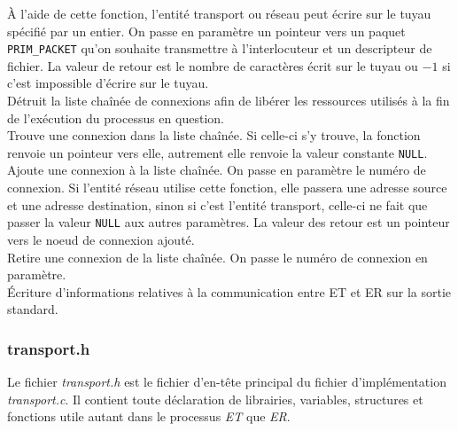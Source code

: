 \documentclass[11pt,french]{article}
\begin{document}
            
            À l'aide de cette fonction, l'entité transport ou réseau peut écrire sur le tuyau spécifié par un entier. On passe en paramètre un pointeur 
            vers un paquet \texttt{PRIM\_PACKET} qu'on souhaite transmettre à l'interlocuteur et un descripteur de fichier. La valeur de retour est
            le nombre de caractères écrit sur le tuyau ou $-1$ si c'est impossible d'écrire sur le tuyau.\\

            
            Détruit la liste chaînée de connexions afin de libérer les ressources utilisés à la fin de l'exécution du processus en question.\\

            
            Trouve une connexion dans la liste chaînée. Si celle-ci s'y trouve, la fonction renvoie un pointeur vers elle, autrement elle renvoie 
            la valeur constante \texttt{NULL}.\\

            
            Ajoute une connexion à la liste chaînée. On passe en paramètre le numéro de connexion. Si l'entité réseau utilise cette fonction, 
            elle passera une adresse source et une adresse destination, sinon si c'est l'entité transport, celle-ci ne fait que passer la valeur 
            \texttt{NULL} aux autres paramètres. La valeur des retour est un pointeur vers le noeud de connexion ajouté.\\

            
            Retire une connexion de la liste chaînée. On passe le numéro de connexion en paramètre.\\

            
            Écriture d'informations relatives à la communication entre ET et ER sur la sortie standard.\\
        \subsubsection{transport.h} %
        \label{ssub:transport.h}
			Le fichier \emph{transport.h} est le fichier d'en-tête principal du fichier d'implémentation \emph{transport.c}. Il contient toute déclaration de librairies, 
            variables, structures et fonctions utile autant dans le processus \emph{ET} que \emph{ER}.\\
            
\end{document}
